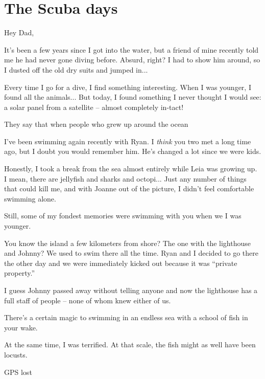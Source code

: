 \chapter{The Scuba days}

Hey Dad,

It's been a few years since I got into the water, but a friend of mine recently told me he had never gone diving before.
Absurd, right?
I had to show him around, so I dusted off the old dry suits and jumped in...


Every time I go for a dive, I find something interesting.
When I was younger, I found all the animals...
But today, I found something I never thought I would see: a solar panel from a satellite -- almost completely in-tact!

They say that when people who grew up around the ocean 

I've been swimming again recently with Ryan.
I \textit{think} you two met a long time ago, but I doubt you would remember him.
He's changed a lot since we were kids.

Honestly, I took a break from the sea almost entirely while Leia was growing up.
I mean, there are jellyfish and sharks and octopi... Just any number of things that could kill me, and with Joanne out of the picture, I didn't feel comfortable swimming alone.

Still, some of my fondest memories were swimming with you when we I was younger.

You know the island a few kilometers from shore?
The one with the lighthouse and Johnny?
We used to swim there all the time.
Ryan and I decided to go there the other day and we were immediately kicked out because it was ``private property.''

I guess Johnny passed away without telling anyone and now the lighthouse has a full staff of people -- none of whom knew either of us.

There's a certain magic to swimming in an endless sea with a school of fish in your wake.

At the same time, I was terrified.
At that scale, the fish might as well have been locusts.

GPS lost
